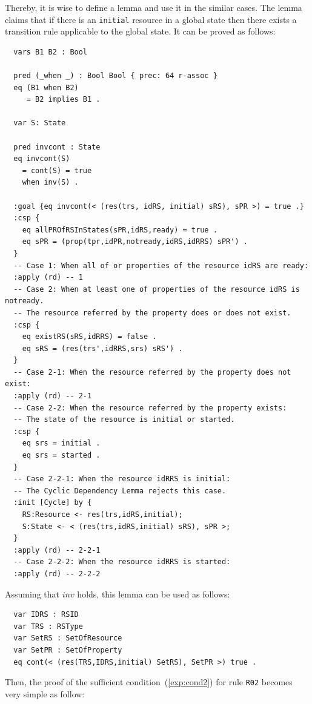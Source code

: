 \documentclass[12pt]{report}
\begin{document}
Thereby, it is wise to define a lemma and use it in the similar cases.
The lemma claims that if there is an {\tt initial} resource in a
global state then there exists a transition rule applicable to the
global state. It can be proved as follows:
\small
\begin{verbatim}
  vars B1 B2 : Bool

  pred (_when _) : Bool Bool { prec: 64 r-assoc }
  eq (B1 when B2)
     = B2 implies B1 .

  var S: State

  pred invcont : State
  eq invcont(S) 
    = cont(S) = true
    when inv(S) .

  :goal {eq invcont(< (res(trs, idRS, initial) sRS), sPR >) = true .}
  :csp { 
    eq allPROfRSInStates(sPR,idRS,ready) = true .
    eq sPR = (prop(tpr,idPR,notready,idRS,idRRS) sPR') .
  }
  -- Case 1: When all of or properties of the resource idRS are ready:
  :apply (rd) -- 1
  -- Case 2: When at least one of properties of the resource idRS is notready.
  -- The resource referred by the property does or does not exist.
  :csp {
    eq existRS(sRS,idRRS) = false .
    eq sRS = (res(trs',idRRS,srs) sRS') .
  }
  -- Case 2-1: When the resource referred by the property does not exist:
  :apply (rd) -- 2-1
  -- Case 2-2: When the resource referred by the property exists:
  -- The state of the resource is initial or started.
  :csp { 
    eq srs = initial .
    eq srs = started .
  }
  -- Case 2-2-1: When the resource idRRS is initial:
  -- The Cyclic Dependency Lemma rejects this case.
  :init [Cycle] by {
    RS:Resource <- res(trs,idRS,initial);
    S:State <- < (res(trs,idRS,initial) sRS), sPR >;
  }
  :apply (rd) -- 2-2-1
  -- Case 2-2-2: When the resource idRRS is started:
  :apply (rd) -- 2-2-2
\end{verbatim}
\normalsize
Assuming that $inv$ holds, this lemma can be used as follows:
\small
\begin{verbatim}
  var IDRS : RSID 
  var TRS : RSType
  var SetRS : SetOfResource
  var SetPR : SetOfProperty
  eq cont(< (res(TRS,IDRS,initial) SetRS), SetPR >) true .
\end{verbatim}
\normalsize
Then, the proof of the sufficient condition~(\ref{exp:cond2}) for rule
{\tt R02} becomes very simple as follow:
\end{document}
